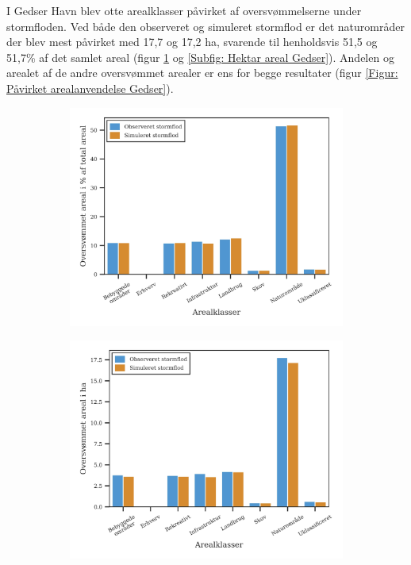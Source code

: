 I Gedser Havn blev otte arealklasser påvirket af oversvømmelserne under stormfloden. Ved både den observeret og simuleret stormflod er det naturområder der blev mest påvirket med 17,7 og 17,2 ha, svarende til henholdsvis 51,5 og 51,7\% af det samlet areal (figur \ref{Subfig: Procent areal Gedser} og \ref{Subfig: Hektar areal Gedser}).
Andelen og arealet af de andre oversvømmet arealer er ens for begge resultater (figur \ref{Figur: Påvirket arealanvendelse Gedser}).
\begin{figure}[H]
    \begin{subfigure}[b]{0.5\textwidth}
        \centering
        \includegraphics[width=1\linewidth]{images/Resultater/areal_anvendelses_grafer/gedser_arealanvendelse.jpg}
        \caption{}
        \label{Subfig: Procent areal Gedser}
    \end{subfigure}
    \begin{subfigure}[b]{0.5\textwidth}
        \centering
        \includegraphics[width=1\linewidth]{images/Resultater/areal_anvendelses_grafer/gedser_oversvommet_Hektar.jpg}

\end{subfigure}
\end{figure}

